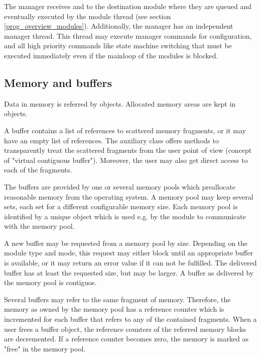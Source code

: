The manager receives and  
to the destination module where they are queued and eventually executed 
by the module thread (see section \ref{prog_overview_modules}).
Additionally, the manager has an independent manager thread. 
This thread may execute manager commands for configuration, 
and all high priority commands like state machine switching 
that must be executed immediately even if the mainloop of the modules is blocked.
 
 
\subsection{Memory and buffers}
Data in memory is referred by   objects. 
Allocated memory areas are kept in\\
objects. 
   

A buffer contains a list of references to scattered memory 
fragments, or it may have an empty list of references. 
The auxiliary class   
offers methods to transparently 
treat the scattered fragments from the user point of view 
(concept of "virtual contiguous buffer"). 
Moreover, the user may also get direct access to each of the fragments.      

The buffers are provided by one or several memory pools 
which preallocate reasonable memory from the operating system. 
A memory pool may keep several sets, each set for a different 
configurable memory size. Each memory pool is identified by a 
unique   
object which is used e.g. by the module to 
communicate with the memory pool.  

A new buffer may be requested from a memory pool by size. 
Depending on the module type and mode, this request may either block until an 
appropriate buffer is available, or it may return an error value 
if it can not be fulfilled. The delivered buffer has at 
least the requested size, but may be larger. A buffer as 
delivered by the memory pool is contiguos. 

Several buffers may refer to the same fragment of memory. 
Therefore, the memory as owned by the memory pool has a 
reference counter which is incremented for each buffer 
that refers to any of the contained fragments. When a user frees 
a buffer object, the reference counters of the referred 
memory blocks are decremented. If a reference counter becomes 
zero, the memory is marked as "free" in the memory pool.

